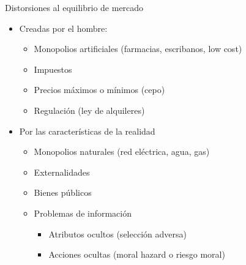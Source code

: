 \documentclass{beamer}
\begin{document}
\begin{frame}{Distorsiones al equilibrio de mercado}
    \begin{itemize}
        \item Creadas por el hombre:
        \begin{itemize}
            \item Monopolios artificiales (farmacias, escribanos, low cost)
             \vspace{1mm}
            \item Impuestos
             \vspace{1mm}
            \item Precios máximos o mínimos (cepo)
             \vspace{1mm}
            \item Regulación (ley de alquileres)
        \end{itemize}
        \item Por las características de la realidad
        \begin{itemize}
            \item Monopolios naturales (red eléctrica, agua, gas)   
             \vspace{1mm}
            \item Externalidades
             \vspace{1mm}
            \item Bienes públicos
            \vspace{1mm}
            \item Problemas de información
            \begin{itemize}
                \item Atributos ocultos (selección adversa)
                 \vspace{1mm}
                \item Acciones ocultas (moral hazard o riesgo moral)
            \end{itemize}        
        \end{itemize}
    \end{itemize}
\end{frame}
\end{document}
